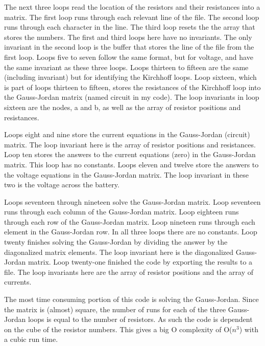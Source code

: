\documentclass{article}
\begin{document}
The next three loops read the location of the resistors and their resistances into a matrix. The first loop runs through each relevant line of the file. The second loop runs through each character in the line. The third loop resets the the array that stores the numbers. The first and third loops here have no invariants. The only invariant in the second loop is the buffer that stores the line of the file from the first loop. Loops five to seven follow the same format, but for voltage, and have the same invariant as these three loops. Loops thirteen to fifteen are the same (including invariant) but for identifying the Kirchhoff loops. Loop sixteen, which is part of loops thirteen to fifteen, stores the resistances of the Kirchhoff loop into the Gauss-Jordan matrix (named circuit in my code). The loop invariants in loop sixteen are the nodes, a and b, as well as the array of resistor positions and resistances.

Loops eight and nine store the current equations in the Gauss-Jordan (circuit) matrix. The loop invariant here is the array of resistor positions and resistances. Loop ten stores the answers to the current equations (zero) in the Gauss-Jordan matrix. This loop has no constants. Loops eleven and twelve store the answers to the voltage equations in the Gauss-Jordan matrix. The loop invariant in these two is the voltage across the battery.

Loops seventeen through nineteen solve the Gauss-Jordan matrix. Loop seventeen runs through each column of the Gauss-Jordan matrix. Loop eighteen runs through each row of the Gauss-Jordan matrix. Loop nineteen runs through each element in the Gauss-Jordan row. In all three loops there are no constants. Loop twenty finishes solving the Gauss-Jordan by dividing the answer by the diagonalized matrix elements. The loop invariant here is the diagonalized Gauss-Jordan matrix. Loop twenty-one finished the code by exporting the results to a file. The loop invariants here are the array of resistor positions and the array of currents.

The most time consuming portion of this code is solving the Gauss-Jordan. Since the matrix is (almost) square, the number of runs for each of the three Gauss-Jordan loops is equal to the number of resistors. As such the code is dependent on the cube of the resistor numbers. This gives a big O complexity of O($n^3$) with a cubic run time.
\end{document}
